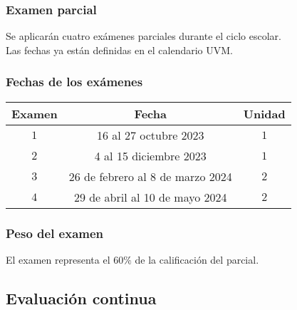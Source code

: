 \documentclass[14pt]{beamer}
\begin{document}
\begin{frame}
\frametitle{Examen parcial}
Se aplicarán cuatro exámenes parciales durante el ciclo escolar.
\\
\bigskip
Las fechas ya están definidas en el calendario UVM.
\end{frame}
\begin{frame}
\frametitle{Fechas de los exámenes}
\begin{table}
\renewcommand{\arraystretch}{1.1}
\centering
\begin{tabular}{c | c | c}
Examen & Fecha & Unidad \\ \hline
$1$ & 16 al 27 octubre 2023 & $1$ \\ \hline
$2$ & 4 al 15 diciembre 2023 & $1$ \\ \hline
$3$ & 26 de febrero al 8 de marzo 2024 & $2$ \\ \hline
$4$ & 29 de abril al 10 de mayo 2024 & $2$ \\ \hline
\end{tabular}
\end{table}
\end{frame}
\begin{frame}
\frametitle{Peso del examen}
El examen representa el $60\%$ de la calificación del parcial.
\end{frame}

\subsection{Evaluación continua}
\end{document}
